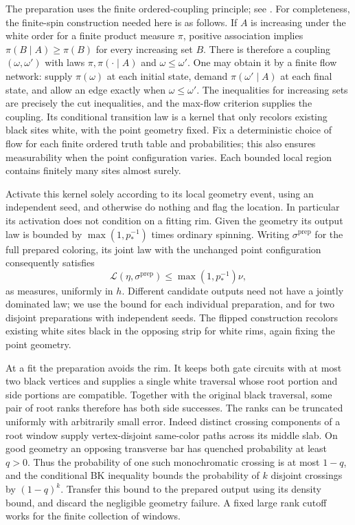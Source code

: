 The preparation uses the finite ordered-coupling principle; see
\cite[Theorem~4.1 and its finite-network discussion]{Edwards1978}.
For completeness, the finite-spin construction needed here is as follows.  If $A$ is increasing under the white order for a finite
product measure $\pi$, positive association implies
$\pi(B\mid A)\ge\pi(B)$ for every increasing set $B$.
There is therefore a coupling $(\omega,\omega')$ with laws
$\pi,\pi(\cdot\mid A)$ and $\omega\le\omega'$.
One may obtain it by a finite flow network: supply $\pi(\omega)$ at
each initial state, demand $\pi(\omega'\mid A)$ at each final state,
and allow an edge exactly when $\omega\le\omega'$.  The inequalities
for increasing sets are precisely the cut inequalities, and the
max-flow criterion supplies the coupling.  Its conditional transition
law is a kernel that only recolors existing black sites white,
with the point geometry fixed.  Fix a deterministic choice of
flow for each finite ordered truth table and probabilities; this also
ensures measurability when the point configuration varies.  Each
bounded local region contains finitely many sites almost surely.

Activate this kernel solely according to its local geometry event,
using an independent seed, and otherwise do nothing and flag the
location.  In particular its activation does not condition on a
fitting rim.  Given the geometry its output law is bounded by
$\max(1,p_*^{-1})$ times ordinary spinning.  Writing
$\sigma^{\mathrm{prep}}$ for the full prepared coloring, its joint
law with the unchanged point configuration consequently satisfies
\[
 \mathcal L(\eta,\sigma^{\mathrm{prep}})
                 \le \max(1,p_*^{-1})\nu,
\]
as measures, uniformly in $h$.
Different candidate outputs need not have a jointly dominated law;
we use the bound for each individual preparation, and for two
disjoint preparations with independent seeds.  The flipped construction
recolors existing white sites black in the opposing strip for white rims,
again fixing the point geometry.

At a fit the preparation avoids the rim.  It keeps both gate circuits
with at most two black vertices and supplies a single white traversal
whose root portion and side portions are compatible.  Together with
the original black traversal, some pair of root ranks therefore has
both side successes.  The ranks can be truncated uniformly with
arbitrarily small error.  Indeed distinct crossing components of a
root window supply vertex-disjoint same-color paths across its middle
slab.  On good geometry an opposing transverse bar has quenched
probability at least $q>0$.  Thus the probability of one such
monochromatic crossing is at most $1-q$, and the conditional BK
inequality bounds the probability of $k$ disjoint crossings by
$(1-q)^k$.  Transfer this bound to the prepared output using its
density bound, and discard the negligible geometry failure.  A fixed
large rank cutoff works for the finite collection of windows.

